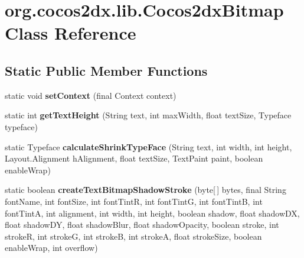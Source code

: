 \hypertarget{classorg_1_1cocos2dx_1_1lib_1_1Cocos2dxBitmap}{}\section{org.\+cocos2dx.\+lib.\+Cocos2dx\+Bitmap Class Reference}
\label{classorg_1_1cocos2dx_1_1lib_1_1Cocos2dxBitmap}
\subsection*{Static Public Member Functions}
\begin{DoxyCompactItemize}
\item 
\mbox{\label{classorg_1_1cocos2dx_1_1lib_1_1Cocos2dxBitmap_a496093663e849977e0f7312376f95ac7}} 
static void {\bfseries set\+Context} (final Context context)
\item 
\mbox{\label{classorg_1_1cocos2dx_1_1lib_1_1Cocos2dxBitmap_a0d0a29b7e1e3f37487ddfa0742dfc795}} 
static int {\bfseries get\+Text\+Height} (String text, int max\+Width, float text\+Size, Typeface typeface)
\item 
\mbox{\label{classorg_1_1cocos2dx_1_1lib_1_1Cocos2dxBitmap_ae44f5983f2bf6c31cb07e3255fc64977}} 
static Typeface {\bfseries calculate\+Shrink\+Type\+Face} (String text, int width, int height, Layout.\+Alignment h\+Alignment, float text\+Size, Text\+Paint paint, boolean enable\+Wrap)
\item 
\mbox{\label{classorg_1_1cocos2dx_1_1lib_1_1Cocos2dxBitmap_ada5a235a884be151104b29c4fa14bac1}} 
static boolean {\bfseries create\+Text\+Bitmap\+Shadow\+Stroke} (byte\mbox{[}$\,$\mbox{]} bytes, final String font\+Name, int font\+Size, int font\+TintR, int font\+TintG, int font\+TintB, int font\+TintA, int alignment, int width, int height, boolean shadow, float shadow\+DX, float shadow\+DY, float shadow\+Blur, float shadow\+Opacity, boolean stroke, int strokeR, int strokeG, int strokeB, int strokeA, float stroke\+Size, boolean enable\+Wrap, int overflow)
\item 
\mbox{\label{classorg_1_1cocos2dx_1_1lib_1_1Cocos2dxBitmap_af0a40a8266350683aa94a1abbd43d7c1}} 

\end{DoxyCompactItemize}
